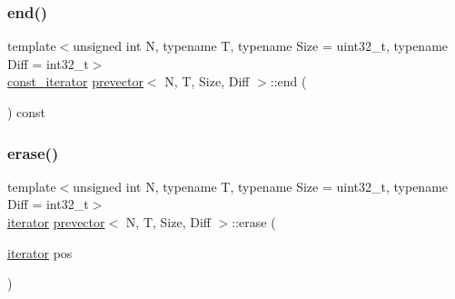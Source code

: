 \mbox{\label{classprevector_a84648e4cb6298fafb70ff9bdd438fcf5}} 
\subsubsection{\texorpdfstring{end()}{end()}\hspace{0.1cm}{\footnotesize\ttfamily [2/2]}}
{\footnotesize\ttfamily template$<$unsigned int N, typename T, typename Size = uint32\+\_\+t, typename Diff = int32\+\_\+t$>$ \\
\mbox{\hyperlink{classprevector_1_1const__iterator}{const\+\_\+iterator}} \mbox{\hyperlink{classprevector}{prevector}}$<$ N, T, Size, Diff $>$\+::end (\begin{DoxyParamCaption}{ }\end{DoxyParamCaption}) const\hspace{0.3cm}{\ttfamily [inline]}}

\mbox{\label{classprevector_a780af143deebcaaecb164fa1a2d98156}} 
\subsubsection{\texorpdfstring{erase()}{erase()}\hspace{0.1cm}{\footnotesize\ttfamily [1/2]}}
{\footnotesize\ttfamily template$<$unsigned int N, typename T, typename Size = uint32\+\_\+t, typename Diff = int32\+\_\+t$>$ \\
\mbox{\hyperlink{classprevector_1_1iterator}{iterator}} \mbox{\hyperlink{classprevector}{prevector}}$<$ N, T, Size, Diff $>$\+::erase (\begin{DoxyParamCaption}\item[{\mbox{\hyperlink{classprevector_1_1iterator}{iterator}}}]{pos }\end{DoxyParamCaption})\hspace{0.3cm}{\ttfamily [inline]}}

\mbox{\label{classprevector_a1bcffc1a855e24c2ac67b11f55d80d5f}} 

